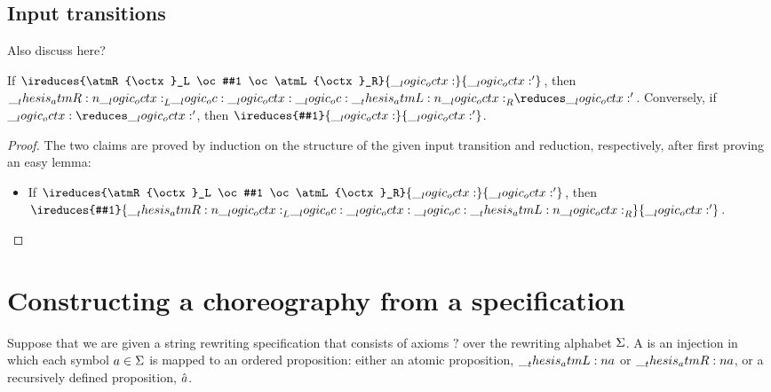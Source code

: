 \subsection{Input transitions}

Also discuss here?


\begin{theorem}
  If $\ireduces{\atmR{\octx}_L \oc #1 \oc \atmL{\octx}_R}{\octx}{\octx'}$, then $\atmR{\octx}_L \oc \octx \oc \atmL{\octx}_R \reduces \octx'$.
  Conversely, if $\octx \reduces \octx'$, then $\ireduces{#1}{\octx}{\octx'}$.
\end{theorem}
\begin{proof}
  The two claims are proved by induction on the structure of the given input transition and reduction, respectively, after first proving an easy lemma:
  \begin{itemize}
  \item If $\ireduces{\atmR{\octx}_L \oc #1 \oc \atmL{\octx}_R}{\octx}{\octx'}$, then $\ireduces{#1}{\atmR{\octx}_L \oc \octx \oc \atmL{\octx}_R}{\octx'}$.
  \qedhere
  \end{itemize}
\end{proof}

\section{Constructing a choreography from a specification}

Suppose that we are given a string rewriting specification that consists of axioms $?$ over the rewriting alphabet $\Sigma$.
A  is an injection in which each symbol $a \in \Sigma$ is mapped to an ordered proposition: either an atomic proposition, $\__thesis_atmL:n {a}$ or $\__thesis_atmR:n {a}$, or a recursively defined proposition, $\hat{a}$.

